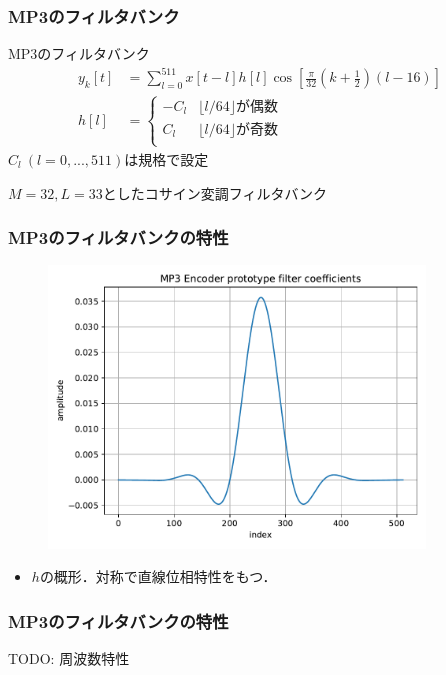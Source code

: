 \documentclass[14pt,xcolor=dvipsnames,table,dvipdfmx]{beamer}
\begin{document}
\begin{frame}[c]
    \frametitle{MP3のフィルタバンク}
    \begin{block}{MP3のフィルタバンク}
        \vspace{-10pt}
        \begin{align}
            y_{k}[t] &= \sum_{l = 0}^{511} x[t - l] h[l] \cos\left[ \frac{\pi}{32}\left( k + \frac{1}{2} \right) \left( l - 16 \right) \right] \\
            h[l] &= \left\{ \begin{array}{ll}
                -C_{l} & \lfloor l / 64 \rfloor \text{が偶数} \\
                 C_{l} & \lfloor l / 64 \rfloor \text{が奇数} \\
            \end{array} \right.
        \end{align}
        $C_{l}\ (l = 0,...,511)$は規格で設定
    \end{block}
    $M = 32, L = 33$としたコサイン変調フィルタバンク
\end{frame}

\begin{frame}[c]
    \frametitle{MP3のフィルタバンクの特性}
    \vspace{-5pt}
    \begin{figure}
        \includegraphics[width=100mm]{./figs/mp3_encoder_prototype_filter_coef.pdf}
    \end{figure}
    \vspace{-5pt}
    \begin{itemize}
        \item $h$の概形．対称で直線位相特性をもつ．
    \end{itemize}
\end{frame}

\begin{frame}[c]
    \frametitle{MP3のフィルタバンクの特性}
    TODO: 周波数特性
\end{frame}
\end{document}
